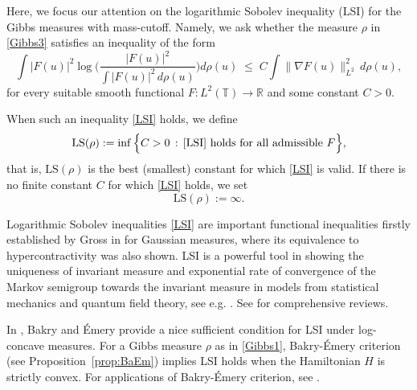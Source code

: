 \documentclass[letterpaper, 11pt,  reqno]{amsart}
\theoremstyle{definition}
\newcommand{\1}{\mathbbm 1}
\newcommand{\R}{\mathbb{R}}
\newcommand{\T}{\mathbb{T}}
\newcommand{\0}{\mathbf 0}
\numberwithin{equation}{section}
\numberwithin{theorem}{section}
\begin{document}
Here, we focus our attention on the logarithmic Sobolev inequality (LSI) for the Gibbs measures with mass-cutoff. Namely, we ask whether the measure
$\rho$ in \eqref{Gibbs3} satisfies an inequality of the form 
\begin{equation}\label{LSI}
    \int |F(u)|^2 \log \Big( \frac{|F(u)|^2}{\int |F(u)|^2 \, d \rho(u)}\Big) d \rho(u) 
    \;\le\; C \int \| \nabla F(u) \|_{L^2}^2 \, d \rho(u),
\end{equation}
for every suitable smooth functional $F : L^2(\T) \to \R$ and some constant $C>0$.
 
When such an inequality \eqref{LSI} holds, we define
\begin{equation}\label{df-lsi}
    \mathrm{LS}(\rho)
    := \inf\Big\{ C>0 \,:\, \eqref{LSI} \text{ holds for all admissible } F \Big\},
\end{equation}
that is, $\mathrm{LS}(\rho)$ is the best (smallest) constant for which \eqref{LSI} is valid.
If there is no finite constant $C$ for which \eqref{LSI} holds, we set
\begin{equation}\label{df-nlsi}
    \mathrm{LS}(\rho) := \infty.
\end{equation}
 
 
 
 
Logarithmic Sobolev inequalities \eqref{LSI} are important 
functional inequalities firstly established by Gross in 
\cite{Gross}
for Gaussian measures, where its equivalence to hypercontractivity was also shown. LSI is a powerful tool in showing the uniqueness of invariant measure and exponential rate of convergence of the Markov semigroup towards the invariant measure in models from statistical mechanics and quantum field theory, see e.g. \cite{HS, Z1, Z2}.
See \cite{BGL, GZ} for comprehensive reviews.   
 
 
 
 
 
 
 
 
 
 
 
 
 
 
In \cite{BaEm}, Bakry and \'Emery provide a nice sufficient condition for LSI under log-concave measures. 
For a Gibbs measure $\rho$ as in \eqref{Gibbs1}, 
Bakry-\'Emery criterion 
(see Proposition~\ref{prop:BaEm}) implies 
LSI holds when the Hamiltonian $H$ is strictly 
convex. For applications of Bakry-\'Emery criterion, 
see \cite{CS,Ledoux, GZ}.
 
 
 
\end{document}
